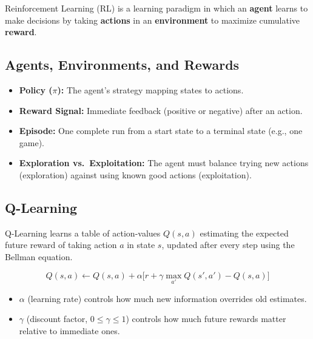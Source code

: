 \documentclass[11pt,a4paper]{article}
\begin{document}
\begin{definitionbox}
Reinforcement Learning (RL) is a learning paradigm in which an \textbf{agent} learns to make decisions by taking \textbf{actions} in an \textbf{environment} to maximize cumulative \textbf{reward}.
\end{definitionbox}

\subsection{Agents, Environments, and Rewards}
\begin{center}
\end{center}

\begin{itemize}[leftmargin=*]
  \item \textbf{Policy ($\pi$):} The agent's strategy mapping states to actions.
  \item \textbf{Reward Signal:} Immediate feedback (positive or negative) after an action.
  \item \textbf{Episode:} One complete run from a start state to a terminal state (e.g., one game).
  \item \textbf{Exploration vs.\ Exploitation:} The agent must balance trying new actions (exploration) against using known good actions (exploitation).
\end{itemize}

\subsection{Q-Learning}
\begin{definitionbox}[Q-Learning]
Q-Learning learns a table of action-values $Q(s,a)$ estimating the expected future reward of taking action $a$ in state $s$, updated after every step using the Bellman equation.
\end{definitionbox}
$$
Q(s,a) \leftarrow Q(s,a) + \alpha\Big[r + \gamma \max_{a'} Q(s',a') - Q(s,a)\Big]
$$
\begin{itemize}[leftmargin=*]
  \item $\alpha$ (learning rate) controls how much new information overrides old estimates.
  \item $\gamma$ (discount factor, $0 \leq \gamma \leq 1$) controls how much future rewards matter relative to immediate ones.
\end{itemize}
\end{document}
